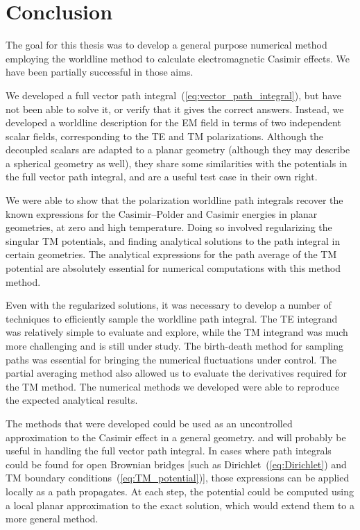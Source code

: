 \chapter{Conclusion}

The goal for this thesis was to develop a general purpose numerical method
employing the worldline method to calculate electromagnetic Casimir effects. 
We have been partially successful in those aims.   %

We developed a full vector path integral~(\ref{eq:vector_path_integral}), but have not 
been able to solve it, or verify that it gives the correct answers.
Instead, we developed a worldline description for the EM field in terms of two independent scalar fields, corresponding 
to the TE and TM polarizations.   
Although the decoupled scalars are adapted to a planar geometry (although they may describe
a spherical geometry as well), they share some similarities with the potentials in the full vector
path integral, and are a useful test case in their own right.    

We were able to show that the polarization worldline path integrals recover the known expressions for the 
Casimir--Polder and Casimir energies in planar geometries, at zero and high temperature.  
Doing so involved regularizing the singular TM potentials, and finding analytical solutions to the path integral
in certain geometries.  The analytical expressions for the path average of the TM potential are 
absolutely essential for numerical computations with this method method.  

Even with the regularized solutions, it was necessary to develop a number of techniques to efficiently
sample the worldline path integral.  The TE integrand was relatively simple to evaluate and explore, while the TM
integrand was much more challenging and is still under study.
The birth-death method for sampling paths was essential for bringing the numerical fluctuations under control.
The partial averaging method also allowed us to evaluate the derivatives required for the TM method.
The numerical methods we developed were able to reproduce the expected analytical results.

The methods that were developed could be used as an uncontrolled approximation to the Casimir effect in a general geometry.
and will probably be useful in handling the full vector path integral.    
In cases where path integrals could be found for open Brownian bridges [such as
Dirichlet~(\ref{eq:Dirichlet}) and TM boundary conditions~(\ref{eq:TM_potential})], 
those expressions can be applied locally as a path propagates.  
At each step, the potential could be computed using a local planar approximation to the exact solution,
which would extend them to a more general method.  

